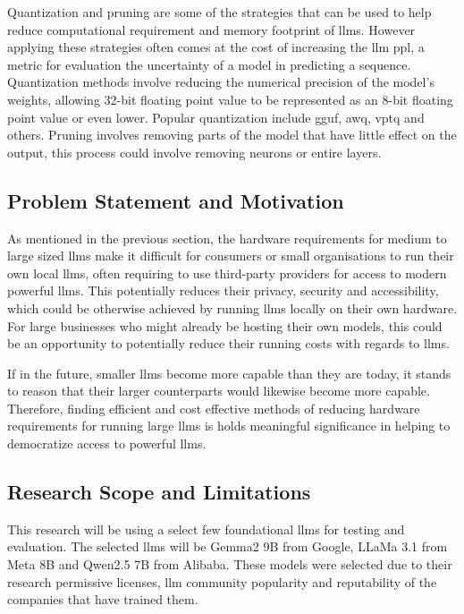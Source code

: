 \documentclass{ifacconf}
\begin{document}
	Quantization and pruning are some of the strategies that can be used to help reduce computational requirement and memory footprint of \glspl{llm}. However applying these strategies often comes at the cost of increasing the \gls{llm} \gls{ppl}, a metric for evaluation the uncertainty of a model in predicting a sequence. Quantization methods involve reducing the numerical precision of the model's weights, allowing 32-bit floating point value to be represented as an 8-bit floating point value or even lower. Popular quantization include \gls{gguf}\cite{llamacpp, ggml}, \gls{awq}\cite{lin2024awqactivationawareweightquantization}, \gls{vptq}\cite{liu2024vptqextremelowbitvector} and others. Pruning involves removing parts of the model that have little effect on the output, this process could involve removing neurons or entire layers.
	
	\subsection{Problem Statement and Motivation}
	
	As mentioned in the previous section, the hardware requirements for medium to large sized  \glspl{llm} make it difficult for consumers or small organisations to run their own local  \glspl{llm}, often requiring to use third-party providers for access to modern powerful  \glspl{llm}. This potentially reduces their privacy, security and accessibility, which could be otherwise achieved by running  \glspl{llm} locally on their own hardware. For large businesses who might already be hosting their own models, this could be an opportunity to potentially reduce their running costs with regards to \glspl{llm}.
	
	If in the future, smaller \glspl{llm} become more capable than they are today, it stands to reason that their larger counterparts would likewise become more capable. Therefore, finding efficient and cost effective methods of reducing hardware requirements for running large \glspl{llm} is holds meaningful significance in helping to democratize access to powerful \glspl{llm}.
	
	\subsection{Research Scope and Limitations}
	This research will be using a select few foundational \glspl{llm} for testing and evaluation. The selected \glspl{llm} will be Gemma2 9B from Google\cite{gemmateam2024gemma2improvingopen}, LLaMa 3.1 from Meta 8B \cite{dubey2024llama3herdmodels} and Qwen2.5 7B from Alibaba\cite{qwen2.5}. These models were selected due to their research permissive licenses, \gls{llm} community popularity and reputability of the companies that have trained them.
	
\end{document}
